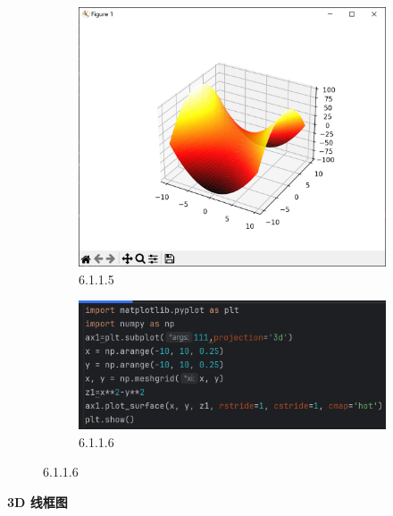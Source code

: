 \documentclass[12pt]{article}
\begin{document}
\begin{figure}[H]
    \centering
    \begin{subfigure}[b]{0.48\textwidth}
        \includegraphics[width=\textwidth]{3D exap Pic3.png} %
        \caption{6.1.1.5}
        \label{fig:line-graph2}
    \end{subfigure}
    \hfill
    \begin{subfigure}[b]{0.48\textwidth}
        \includegraphics[width=\textwidth]{3D exap program3.png} %
        \caption{6.1.1.6}
        \label{fig:line-graph2-pic2}
    \end{subfigure}
\end{figure}

\textbf{\Large 3D 线框图}
\end{document}
